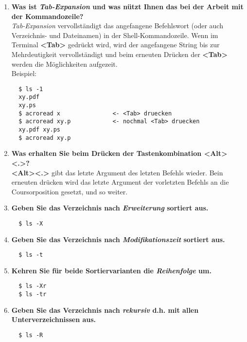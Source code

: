 \documentclass[
   draft=false
  ,paper=a4
  ,twoside=false
  ,fontsize=11pt
  ,headsepline
  ,BCOR10mm
  ,DIV11
]{scrartcl} %
\begin{document}
\begin{enumerate}
  \item \textbf{Was ist \emph{Tab-Expansion} und was nützt Ihnen das bei der
  Arbeit mit der Kommandozeile?} \\
  \emph{Tab-Expansion} vervollständigt das angefangene Befehlswort (oder auch
  Verzeichnis- und Dateinamen) in der Shell-Kommandozeile. Wenn im
  Terminal \textbf{<Tab>} gedrückt wird, wird der angefangene String bis zur
  Mehrdeutigkeit vervollständigt und beim erneuten Drücken der \textbf{<Tab>}
  werden die Möglichkeiten aufgezeit.\\
  Beispiel:
  \begin{verbatim}
  $ ls -1
  xy.pdf
  xy.ps
  $ acroread x               <- <Tab> druecken
  $ acroread xy.p            <- nochmal <Tab> druecken
  xy.pdf xy.ps
  $ acroread xy.p
  \end{verbatim}

  \item \textbf{Was erhalten Sie beim Drücken der Tastenkombination
  \textbf{<Alt><.>}?}\\
  \textbf{<Alt><.>} gibt das letzte Argument des letzten Befehls wieder.
  Bein erneuten drücken wird das letzte Argument der vorletzten Befehls
  an die Coursorposition gesetzt, und so weiter.

  \item \textbf{Geben Sie das Verzeichnis nach \emph{Erweiterung} sortiert aus.
  }\\
  \begin{verbatim}
  $ ls -X
  \end{verbatim}

  \item \textbf{Geben Sie das Verzeichnis nach \emph{Modifikationszeit}
  sortiert aus.}\\
  \begin{verbatim}
  $ ls -t
  \end{verbatim}

  \item \textbf{Kehren Sie für beide Sortiervarianten die \emph{Reihenfolge}
  um.}\\
  \begin{verbatim}
  $ ls -Xr
  $ ls -tr
  \end{verbatim}

  \item \textbf{Geben Sie das Verzeichnis nach \emph{rekursiv} d.h. mit allen
  Unterverzeichnissen aus.}\\
  \begin{verbatim}
  $ ls -R
  \end{verbatim}


\end{enumerate}
\end{document}
